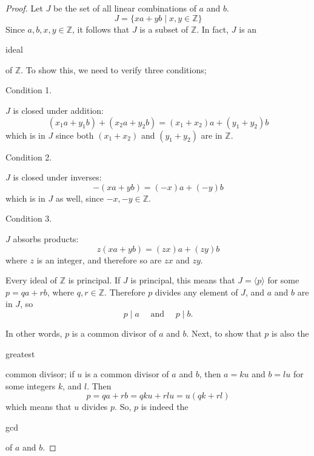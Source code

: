 \documentclass{article}
\theoremstyle{definition}
\theoremstyle{definition}
\begin{document}
\begin{proof}
Let $J$ be the set of all linear combinations of $a$ and $b$.
$$J = \{ xa + yb \mid x, y \in \mathbb{Z} \}$$
Since $a, b, x, y \in \mathbb{Z}$, it follows that $J$ is a subset of $\mathbb{Z}$. In fact, $J$ is an \begin{em}ideal\end{em} of $\mathbb{Z}$. To show this, we need to verify three conditions;

\begin{em}Condition 1.\end{em} $J$ is closed under addition:
$$(x_1a + y_1b) + (x_2a + y_2b) = (x_1 + x_2)a + (y_1 + y_2)b$$
which is in $J$ since both $(x_1 + x_2)$ and $(y_1 + y_2)$ are in $\mathbb{Z}$.

\begin{em}Condition 2.\end{em} $J$ is closed under inverses:
$$-(xa + yb) = (-x)a + (-y)b$$
which is in $J$ as well, since $-x, -y \in \mathbb{Z}$.

\begin{em}Condition 3.\end{em} $J$ absorbs products:
$$z(xa + yb) = (zx)a + (zy)b$$
where $z$ is an integer, and therefore so are $zx$ and $zy$.

Every ideal of $\mathbb{Z}$ is principal. If $J$ is principal, this means that $ J = \langle p \rangle $ for some $p = qa + rb$, where $q, r \in \mathbb{Z}$. Therefore $p$ divides any element of $J$, and $a$ and $b$ are in $J$, so
$$p \mid a \quad \text{ and } \quad p \mid b.$$

In other words, $p$ is a common divisor of $a$ and $b$. Next, to show that $p$ is also the \begin{em}greatest\end{em} common divisor; if $u$ is a common divisor of $a$ and $b$, then $a = ku$ and $b = lu$ for some integers $k$, and $l$. Then
$$p = qa + rb = qku + rlu = u(qk + rl)$$
which means that $u$ divides $p$. So, $p$ is indeed the \begin{em}gcd\end{em} of $a$ and $b$.
\end{proof}
\end{document}

